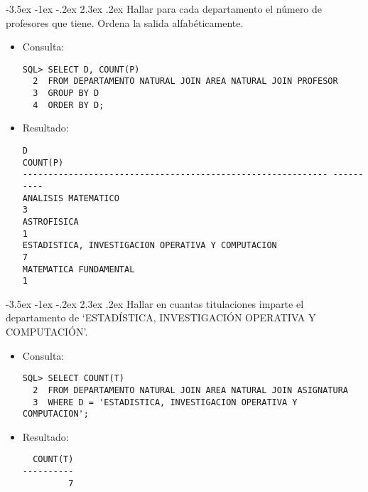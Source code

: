 \documentclass[11pt]{report}
\makeatletter
\renewcommand\chapter{\@startsection{chapter}{0}{\z@}%
    {-3.5ex \@plus -1ex \@minus -.2ex}%
    {2.3ex \@plus.2ex}%
    {\normalfont\Large\bfseries}}
\makeatother
\begin{document}
\chapter{Hallar para cada departamento el número de profesores que tiene. Ordena la salida alfabéticamente.}
\begin{itemize}
  \item Consulta:
  \begin{verbatim}
SQL> SELECT D, COUNT(P)
  2  FROM DEPARTAMENTO NATURAL JOIN AREA NATURAL JOIN PROFESOR
  3  GROUP BY D
  4  ORDER BY D;
  \end{verbatim}
  \item{Resultado:}
  \begin{verbatim}
D                                                              COUNT(P)         
------------------------------------------------------------ ----------         
ANALISIS MATEMATICO                                                   3         
ASTROFISICA                                                           1         
ESTADISTICA, INVESTIGACION OPERATIVA Y COMPUTACION                    7         
MATEMATICA FUNDAMENTAL                                                1                                                                     
  \end{verbatim}
\end{itemize}

\chapter{Hallar en cuantas titulaciones imparte el departamento de ‘ESTADÍSTICA, INVESTIGACIÓN OPERATIVA Y COMPUTACIÓN’.}
\begin{itemize}
  \item Consulta:
  \begin{verbatim}
SQL> SELECT COUNT(T)
  2  FROM DEPARTAMENTO NATURAL JOIN AREA NATURAL JOIN ASIGNATURA
  3  WHERE D = 'ESTADISTICA, INVESTIGACION OPERATIVA Y COMPUTACION';
  \end{verbatim}
  \item{Resultado:}
  \begin{verbatim}
  COUNT(T)                                                                      
----------                                                                      
         7                                                                        
  \end{verbatim}
\end{itemize}
\end{document}
